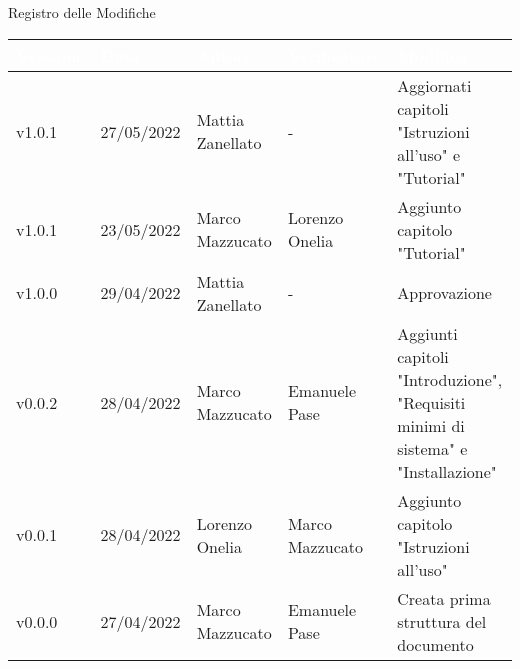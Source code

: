 \begin{center}
  \huge{Registro delle Modifiche}
\end{center}
\renewcommand\arraystretch{1,5}
{\centering
\begin{longtable}{|C{1.8cm}|C{2.1cm}|C{2cm}|C{2.4cm}|L{4.4cm}|}
  \hline
  \textcolor[HTML]{FFFFFF}{\textbf{Versione}} & \textcolor[HTML]{FFFFFF}{\textbf{Data}} & \textcolor[HTML]{FFFFFF}{\textbf{Autore}}  & \textcolor[HTML]{FFFFFF}{\textbf{Verificatore}} & \textcolor[HTML]{FFFFFF}{\textbf{Modifica}}    \\ \hline
  v1.0.1      & 27/05/2022    & Mattia Zanellato   &  -      & Aggiornati capitoli "Istruzioni all'uso" e "Tutorial"   \\ \hline
  v1.0.1      & 23/05/2022    & Marco Mazzucato   &  Lorenzo Onelia      & Aggiunto capitolo "Tutorial"  \\ \hline
  v1.0.0        & 29/04/2022    & Mattia Zanellato    & -    & Approvazione  \\ \hline
  v0.0.2      & 28/04/2022    & Marco Mazzucato   & Emanuele Pase       & Aggiunti capitoli "Introduzione", "Requisiti minimi di sistema" e "Installazione"\\ \hline
  v0.0.1        & 28/04/2022    & Lorenzo Onelia    & Marco Mazzucato       & Aggiunto capitolo "Istruzioni all'uso" \\ \hline
  v0.0.0        & 27/04/2022    & Marco Mazzucato   &  Emanuele Pase     & Creata prima struttura del documento \\ \hline
\end{longtable}}

\renewcommand\arraystretch{1}
